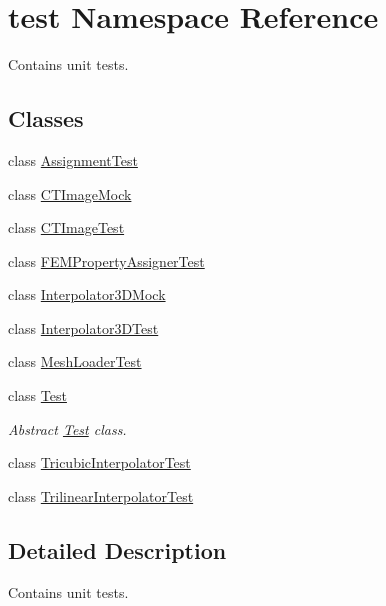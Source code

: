 \hypertarget{namespacetest}{
\section{test Namespace Reference}
\label{namespacetest}
}


Contains unit tests.  


\subsection*{Classes}
\begin{DoxyCompactItemize}
\item 
class \hyperlink{classtest_1_1_assignment_test}{AssignmentTest}
\item 
class \hyperlink{classtest_1_1_c_t_image_mock}{CTImageMock}
\item 
class \hyperlink{classtest_1_1_c_t_image_test}{CTImageTest}
\item 
class \hyperlink{classtest_1_1_f_e_m_property_assigner_test}{FEMPropertyAssignerTest}
\item 
class \hyperlink{classtest_1_1_interpolator3_d_mock}{Interpolator3DMock}
\item 
class \hyperlink{classtest_1_1_interpolator3_d_test}{Interpolator3DTest}
\item 
class \hyperlink{classtest_1_1_mesh_loader_test}{MeshLoaderTest}
\item 
class \hyperlink{classtest_1_1_test}{Test}
\begin{DoxyCompactList}\small\item\em Abstract \hyperlink{classtest_1_1_test}{Test} class. \item\end{DoxyCompactList}\item 
class \hyperlink{classtest_1_1_tricubic_interpolator_test}{TricubicInterpolatorTest}
\item 
class \hyperlink{classtest_1_1_trilinear_interpolator_test}{TrilinearInterpolatorTest}
\end{DoxyCompactItemize}


\subsection{Detailed Description}
Contains unit tests. 